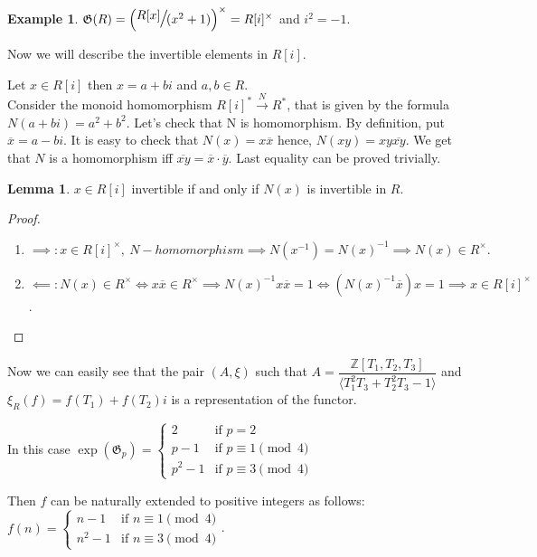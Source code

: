 \documentclass{article}
\theoremstyle{definition}
\newtheorem{example}{Example}
\theoremstyle{definition}
\newtheorem{lemma}{Lemma}
\begin{document}
\begin{example}
    $\mathfrak{G}(R) =  \Large{\left( \sfrac{R[x]}{ (x^2+1)}\right)^{\times}} = 
    R[i]^{\times}$ and $i^2 = -1$.


    Now we will describe the invertible elements in $R[i].$

    Let $x \in R[i]$ then $x = a + bi$ and $a, b \in R$.\\
    Consider the monoid homomorphism $R[i]^*  \xrightarrow{\ N\ } R^*$, that is given by the formula $N(a+bi) = a^2 + b^2.$
    Let's check that N is homomorphism.
    By definition, put $\overline{x} = a - bi$. It is easy to check that $N(x) = x\overline{x}$ hence, $N(xy) = 
    xy\overline{xy}$.
    We get that $N$ is a homomorphism iff $\overline{xy} = \overline{x}\cdot\overline{y}.$
    Last equality can be proved trivially.

    \begin{lemma}
        $x \in R[i]$ invertible if and only if $N(x)$ is invertible in $R$.
    \end{lemma}

    \begin{proof}
    \hspace*{5cm}
    \begin{enumerate}  
         \item $\implies: x \in R[i]^{\times},\ N - homomorphism \implies N(x^{-1}) = N(x)^{-1} \implies N(x)  \in R^{\times}.$
        \item $\impliedby:N(x) \in R^{\times} \iff x\overline{x} \in R^{\times} \implies N(x)^{-1}x\overline{x} = 
        1 \iff (N(x)^{-1}\overline{x})x = 1\implies x \in R[i]^{\times}$.
    \end{enumerate}
    \end{proof}



Now we can easily see that the pair $(A, \xi)$ such that 
$A = \dfrac{\mathbb{Z}[T_1, T_2, T_3]}{\langle T_1^2T_3+T_2^2T_3-1\rangle}$ and $\xi_R(f)=f(T_1)+f(T_2)i$ is a representation 
of the functor.

In this case $\operatorname{exp}(\mathfrak{G}_p) = \begin{cases} 
    2 & \text{if } p = 2 \\
    p - 1 & \text{if } p \equiv 1 \pmod{4} \\
    p^2 - 1 & \text{if } p \equiv 3 \pmod{4}
\end{cases}$

Then $f$ can be naturally extended to positive integers as follows: $f(n) = 
\begin{cases}
    n - 1 & \text{if } n \equiv 1 \pmod{4}\\
    n^2 - 1 & \text{if } n \equiv 3 \pmod{4}
\end{cases}
$.


\end{example}
\end{document}
